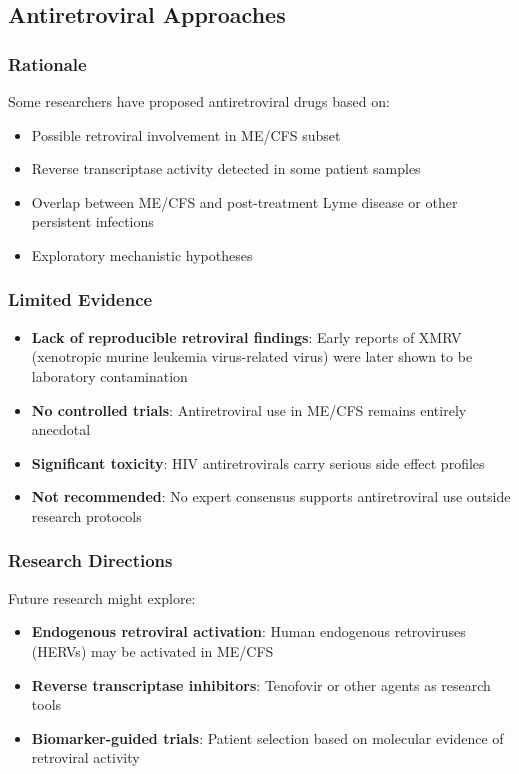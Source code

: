 \subsection{Antiretroviral Approaches}

\subsubsection{Rationale}

Some researchers have proposed antiretroviral drugs based on:
\begin{itemize}
    \item Possible retroviral involvement in ME/CFS subset
    \item Reverse transcriptase activity detected in some patient samples
    \item Overlap between ME/CFS and post-treatment Lyme disease or other persistent infections
    \item Exploratory mechanistic hypotheses
\end{itemize}

\subsubsection{Limited Evidence}

\begin{itemize}
    \item \textbf{Lack of reproducible retroviral findings}: Early reports of XMRV (xenotropic murine leukemia virus-related virus) were later shown to be laboratory contamination
    \item \textbf{No controlled trials}: Antiretroviral use in ME/CFS remains entirely anecdotal
    \item \textbf{Significant toxicity}: HIV antiretrovirals carry serious side effect profiles
    \item \textbf{Not recommended}: No expert consensus supports antiretroviral use outside research protocols
\end{itemize}

\subsubsection{Research Directions}

Future research might explore:
\begin{itemize}
    \item \textbf{Endogenous retroviral activation}: Human endogenous retroviruses (HERVs) may be activated in ME/CFS
    \item \textbf{Reverse transcriptase inhibitors}: Tenofovir or other agents as research tools
    \item \textbf{Biomarker-guided trials}: Patient selection based on molecular evidence of retroviral activity
\end{itemize}

